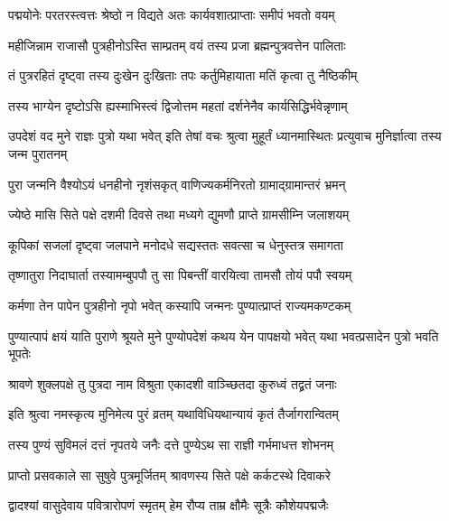 \twolineshloka
{पद्मयोनेः परतरस्त्वत्तः श्रेष्ठो न विद्यते}
{अतः कार्यवशात्प्राप्ताः समीपं भवतो वयम्}%

\twolineshloka
{महीजिन्नाम राजासौ पुत्रहीनोऽस्ति साम्प्रतम्}
{वयं तस्य प्रजा ब्रह्मन्पुत्रवत्तेन पालिताः}%

\twolineshloka
{तं पुत्ररहितं दृष्ट्वा तस्य दुःखेन दुःखिताः}
{तपः कर्तुमिहायाता मतिं कृत्वा तु नैष्ठिकीम्}%

\twolineshloka
{तस्य भाग्येन दृष्टोऽसि ह्यस्माभिस्त्वं द्विजोत्तम}
{महतां दर्शनेनैव कार्यसिद्धिर्भवेन्नृणाम्}%

\threelineshloka
{उपदेशं वद मुने राज्ञः पुत्रो यथा भवेत्}
{इति तेषां वचः श्रुत्वा मुहूर्तं ध्यानमास्थितः}
{प्रत्युवाच मुनिर्ज्ञात्वा तस्य जन्म पुरातनम्}%


\twolineshloka
{पुरा जन्मनि वैश्योऽयं धनहीनो नृशंसकृत्}
{वाणिज्यकर्मनिरतो ग्रामाद्ग्रामान्तरं भ्रमन्}%

\twolineshloka
{ज्येष्ठे मासि सिते पक्षे दशमी दिवसे तथा}
{मध्यगे द्युमणौ प्राप्ते ग्रामसीम्नि जलाशयम्}%

\twolineshloka
{कूपिकां सजलां दृष्ट्वा जलपाने मनोदधे}
{सद्यस्ततः सवत्सा च धेनुस्तत्र समागता}%

\twolineshloka
{तृष्णातुरा निदाघार्ता तस्यामम्बुपपौ तु सा}
{पिबन्तीं वारयित्वा तामसौ तोयं पपौ स्वयम्}%

\twolineshloka
{कर्मणा तेन पापेन पुत्रहीनो नृपो भवेत्}
{कस्यापि जन्मनः पुण्यात्प्राप्तं राज्यमकण्टकम्}%


\threelineshloka
{पुण्यात्पापं क्षयं याति पुराणे श्रूयते मुने}
{पुण्योपदेशं कथय येन पापक्षयो भवेत्}
{यथा भवत्प्रसादेन पुत्रो भवति भूपतेः}%


\twolineshloka
{श्रावणे शुक्लपक्षे तु पुत्रदा नाम विश्रुता}
{एकादशी वाञ्च्छितदा कुरुध्वं तद्व्रतं जनाः}%

\twolineshloka
{इति श्रुत्वा नमस्कृत्य मुनिमेत्य पुरं व्रतम्}
{यथाविधियथान्यायं कृतं तैर्जागरान्वितम्}%

\twolineshloka
{तस्य पुण्यं सुविमलं दत्तं नृपतये जनैः}
{दत्ते पुण्येऽथ सा राज्ञी गर्भमाधत्त शोभनम्}%

\twolineshloka
{प्राप्तो प्रसवकाले सा सुषुवे पुत्रमूर्जितम्}
{श्रावणस्य सिते पक्षे कर्कटस्थे दिवाकरे}%

\twolineshloka
{द्वादश्यां वासुदेवाय पवित्रारोपणं स्मृतम्}
{हेम रौप्य ताम्र क्षौमैः सूत्रैः कौशेयपद्मजैः}%

